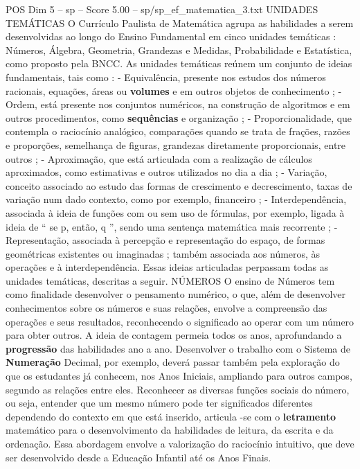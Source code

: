 \begin{textsample}{POS Dim 5 – sp – Score 5.00 – sp/sp\_ef\_matematica\_3.txt}  \label{ex:f5_pos_077}
UNIDADES TEMÁTICAS O Currículo Paulista de Matemática agrupa as habilidades a serem desenvolvidas ao longo do Ensino Fundamental em cinco unidades temáticas : Números, Álgebra, Geometria, Grandezas e Medidas, Probabilidade e Estatística, como proposto pela BNCC.
As unidades temáticas reúnem um conjunto de ideias fundamentais, tais como : - Equivalência, presente nos estudos dos números racionais, equações, áreas ou \textbf{volumes} e em outros objetos de conhecimento ; - Ordem, está presente nos conjuntos numéricos, na construção de algoritmos e em outros procedimentos, como \textbf{sequências} e organização ; - Proporcionalidade, que contempla o raciocínio analógico, comparações quando se trata de frações, razões e proporções, semelhança de figuras, grandezas diretamente proporcionais, entre outros ; - Aproximação, que está articulada com a realização de cálculos aproximados, como estimativas e outros utilizados no dia a dia ; - Variação, conceito associado ao estudo das formas de crescimento e decrescimento, taxas de variação num dado contexto, como por exemplo, financeiro ; - Interdependência, associada à ideia de funções com ou sem uso de fórmulas, por exemplo, ligada à ideia de “ se p, então, q ”, sendo uma sentença matemática mais recorrente ; - Representação, associada à percepção e representação do espaço, de formas geométricas existentes ou imaginadas ; também associada aos números, às operações e à interdependência.
Essas ideias articuladas perpassam todas as unidades temáticas, descritas a seguir.
NÚMEROS O ensino de Números tem como finalidade desenvolver o pensamento numérico, o que, além de desenvolver conhecimentos sobre os números e suas relações, envolve a compreensão das operações e seus resultados, reconhecendo o significado ao operar com um número para obter outros.
A ideia de contagem permeia todos os anos, aprofundando a \textbf{progressão} das habilidades ano a ano.
Desenvolver o trabalho com o Sistema de \textbf{Numeração} Decimal, por exemplo, deverá passar também pela exploração do que os estudantes já conhecem, nos Anos Iniciais, ampliando para outros campos, segundo as relações entre eles.
Reconhecer as diversas funções sociais do número, ou seja, entender que um mesmo número pode ter significados diferentes dependendo do contexto em que está inserido, articula -se com o \textbf{letramento} matemático para o desenvolvimento da habilidades de leitura, da escrita e da ordenação.
Essa abordagem envolve a valorização do raciocínio intuitivo, que deve ser desenvolvido desde a Educação Infantil até os Anos Finais.

\end{textsample}
